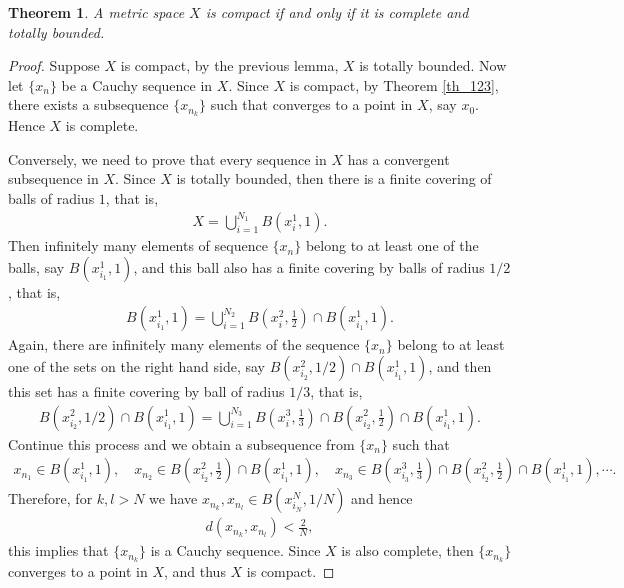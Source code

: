 \documentclass[10pt]{book}
\newtheorem{theorem}{Theorem}[chapter]
\theoremstyle{definition}
\numberwithin{equation}{chapter}
\begin{document}
\begin{theorem}\label{th_125}
A metric space $X$ is compact if and only if it is complete and totally bounded.
\end{theorem}
\begin{proof}
Suppose $X$ is compact, by the previous lemma, $X$ is totally bounded. Now let $\{x_n\}$ be a Cauchy sequence in $X$. Since $X$ is compact, by Theorem \ref{th_123}, there exists a subsequence $\{x_{n_k}\}$ such that converges to a point in $X$, say $x_0$. Hence $X$ is complete.

Conversely, we need to prove that every sequence in $X$ has a convergent subsequence in $X$. Since $X$ is totally bounded, then there is a finite covering of balls of radius $1$, that is,
\begin{align*}
    X = \bigcup^{N_1}_{i=1} B\left(x_i^1, 1\right).
\end{align*}
Then infinitely many elements of sequence $\{x_n\}$ belong to at least one of the balls, say $B\left(x_{i_1}^1, 1\right)$, and this ball also has a finite covering by balls of radius $1/2$, that is,
\begin{align*}
    B\left(x_{i_1}^1, 1\right) = \bigcup^{N_2}_{i=1} B\left(x_i^2, \frac{1}{2}\right) \cap B\left(x_{i_1}^1, 1\right).
\end{align*}
Again, there are infinitely many elements of the sequence $\{x_n\}$ belong to at least one of the sets on the right hand side, say $B\left(x_{i_2}^2, 1/2\right) \cap B\left(x_{i_1}^1, 1\right)$, and then this set has a finite covering by ball of radius $1/3$, that is,
\begin{align*}
    B\left(x_{i_2}^2, 1/2\right) \cap B\left(x_{i_1}^1, 1\right) = \bigcup^{N_3}_{i=1} B\left(x_i^3, \frac{1}{3}\right) \cap B\left(x_{i_2}^2, \frac{1}{2}\right) \cap B\left(x_{i_1}^1, 1\right).
\end{align*}
Continue this process and we obtain a subsequence from $\{x_n\}$ such that
\begin{align*}
    x_{n_1} \in B\left(x_{i_1}^1, 1\right), \quad x_{n_2} \in B\left(x_{i_2}^2, \frac{1}{2}\right) \cap B\left(x_{i_1}^1, 1\right), \quad x_{n_3} \in B\left(x_{i_3}^3, \frac{1}{3}\right) \cap B\left(x_{i_2}^2, \frac{1}{2}\right) \cap B\left(x_{i_1}^1, 1\right), \cdots.
\end{align*}
Therefore, for $k,l > N$ we have $x_{n_k}, x_{n_l} \in B\left(x_{i_N}^N, 1/N\right)$ and hence
\begin{align*}
    d(x_{n_k}, x_{n_l}) < \frac{2}{N},
\end{align*}
this implies that $\{x_{n_k}\}$ is a Cauchy sequence. Since $X$ is also complete, then $\{x_{n_k}\}$ converges to a point in $X$, and thus $X$ is compact.
\end{proof}
\end{document}
